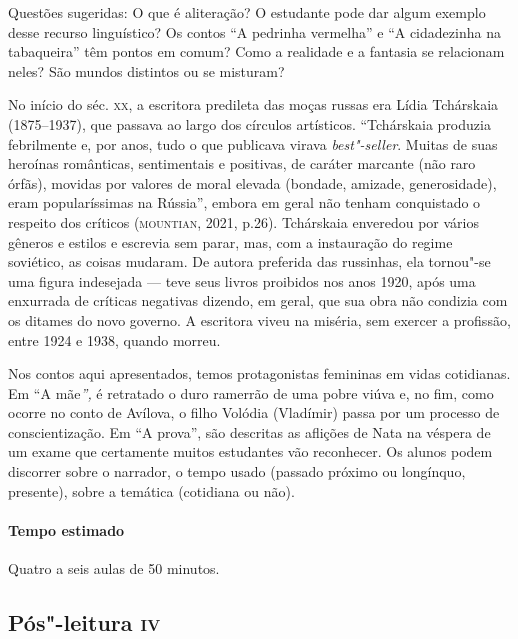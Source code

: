 \documentclass[11pt]{extarticle}
\begin{document}


Questões sugeridas: O que é aliteração? O estudante pode dar algum
exemplo desse recurso linguístico? Os contos ``A pedrinha vermelha'' e
``A cidadezinha na tabaqueira'' têm pontos em comum? Como a realidade e
a fantasia se relacionam neles? São mundos distintos ou se misturam?

No início do séc. \textsc{xx}, a escritora predileta das moças russas era Lídia
Tchárskaia (1875--1937), que passava ao largo dos círculos artísticos.
``Tchárskaia produzia febrilmente e, por anos, tudo o que publicava
virava \emph{best"-seller}. Muitas de suas heroínas românticas,
sentimentais e positivas, de caráter marcante (não raro órfãs), movidas
por valores de moral elevada (bondade, amizade, generosidade), eram
popularíssimas na Rússia'', embora em geral não tenham conquistado o
respeito dos críticos (\textsc{mountian}, 2021, p.26). Tchárskaia enveredou por
vários gêneros e estilos e escrevia sem parar, mas, com a instauração do
regime soviético, as coisas mudaram. De autora preferida das russinhas,
ela tornou"-se uma figura indesejada --- teve seus livros proibidos nos
anos 1920, após uma enxurrada de críticas negativas dizendo, em geral,
que sua obra não condizia com os ditames do novo governo. A escritora
viveu na miséria, sem exercer a profissão, entre 1924 e 1938, quando
morreu.

Nos contos aqui apresentados, temos protagonistas femininas em vidas
cotidianas. Em ``A mãe\emph{'',} é retratado o duro ramerrão de uma
pobre viúva e, no fim, como ocorre no conto de Avílova, o filho Volódia
(Vladímir) passa por um processo de conscientização. Em ``A prova'', são
descritas as aflições de Nata na véspera de um exame que certamente
muitos estudantes vão reconhecer. Os alunos podem discorrer sobre o
narrador, o tempo usado (passado próximo ou longínquo, presente), sobre
a temática (cotidiana ou não).

\paragraph{Tempo estimado} Quatro a seis aulas de 50 minutos.

\subsection{Pós"-leitura \textsc{iv}}
\end{document}

